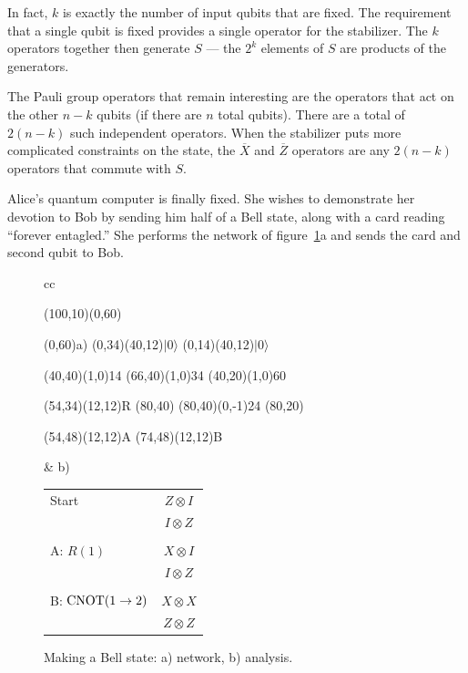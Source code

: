 In fact, $k$ is exactly the number of input qubits that are fixed.
The requirement that a single qubit is fixed provides a single
operator for the stabilizer.  The $k$ operators together then generate
$S$ --- the $2^k$ elements of $S$ are products of the generators.

The Pauli group operators that remain interesting are the operators
that act on the other $n-k$ qubits (if there are $n$ total qubits).
There are a total of $2(n-k)$ such independent operators.  When the
stabilizer puts more complicated constraints on the state, the
$\overline{X}$ and $\overline{Z}$ operators are any $2(n-k)$ operators
that commute with $S$.

\begin{example}
Alice's quantum computer is finally fixed.  She wishes to demonstrate
her devotion to Bob by sending him half of a Bell state, along with a
card reading ``forever entagled.''  She performs the network of
figure~\ref{fig:EPR}a and sends the card and second qubit to Bob.
\end{example}
\begin{figure}
\centering
\begin{tabular}{cc}
\begin{picture}(100,10)(0,60)

\put(0,60){a)}
\put(0,34){\makebox(40,12){$|0\rangle$}}
\put(0,14){\makebox(40,12){$|0\rangle$}}

\put(40,40){\line(1,0){14}}
\put(66,40){\line(1,0){34}}
\put(40,20){\line(1,0){60}}

\put(54,34){\framebox(12,12){R}}
\put(80,40){}
\put(80,40){\line(0,-1){24}}
\put(80,20){}

\put(54,48){\makebox(12,12){A}}
\put(74,48){\makebox(12,12){B}}

\end{picture}
& b)
\begin{tabular}[t]{lc}
Start & $Z \otimes I$ \\
& $I \otimes Z$ \\
\\
A: $R(1)$ & $X \otimes I$ \\
& $I \otimes Z$ \\
\\
B: ${\rm CNOT}(1 \rightarrow 2)$ & $X \otimes X$ \\
& $Z \otimes Z$
\end{tabular}
\end{tabular}
\caption{Making a Bell state: a) network, b) analysis.}
\label{fig:EPR}
\end{figure}

